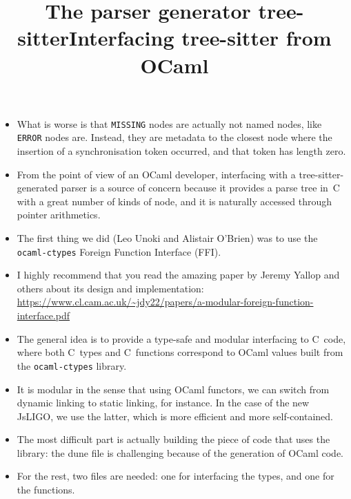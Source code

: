 \documentclass[wide]{slides}
\newcommand{\JsLIGO}[0]{\textsf{JsLIGO}}
\newcommand{\OCaml}[0]{\textsf{OCaml}}
\newcommand{\TreeSitter}[0]{\textsf{tree-sitter}}
\begin{document}
\begin{slide}
  \title{The parser generator tree-sitter}

  \begin{itemize}

    \item What is worse is that \verb|MISSING| nodes are actually not
      named nodes, like \verb|ERROR| nodes are. Instead, they are
      metadata to the closest node where the insertion of a
      synchronisation token occurred, and that token has length zero.

    \item From the point of view of an \OCaml{} developer, interfacing
      with a \TreeSitter\hyp{}generated parser is a source of concern
      because it provides a parse tree in~C with a great number of
      kinds of node, and it is naturally accessed through pointer
      arithmetics.

    \item The first thing we did (Leo Unoki and Alistair O'Brien) was
      to use the \texttt{ocaml-ctypes} Foreign Function Interface
      (FFI).

    \item I highly recommend that you read the amazing paper by Jeremy
      Yallop and others about its design and implementation:
      \url{https://www.cl.cam.ac.uk/~jdy22/papers/a-modular-foreign-function-interface.pdf}

  \end{itemize}

\end{slide}

\begin{slide}
  \title{Interfacing tree-sitter from OCaml}

  \begin{itemize}

    \item The general idea is to provide a type\hyp{}safe and modular
      interfacing to C~code, where both C~types and C~functions
      correspond to \OCaml{} values built from the
      \texttt{ocaml-ctypes} library.

    \item It is modular in the sense that using \OCaml{} functors, we
      can switch from dynamic linking to static linking, for
      instance. In the case of the new \JsLIGO{}, we use the latter,
      which is more efficient and more self\hyp{}contained.

    \item The most difficult part is actually building the piece of
      code that uses the library: the \textsf{dune} file is
      challenging because of the generation of \OCaml{} code.

    \item For the rest, two files are needed: one for interfacing the
      types, and one for the functions.

  \end{itemize}

\end{slide}
\end{document}
